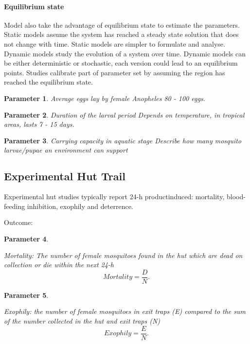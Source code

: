 \documentclass[a4paper, 12pt, twoside]{article}
\newtheorem{parameter}{Parameter}
\begin{document}
\paragraph{Equilibrium state}%
\label{par:equilibrium_state}
Model also take the advantage of equilibrium state to estimate the parameters\cite{Alves2021}.
Static models assume the system has reached a steady state solution that does not change with time.
Static models are simpler to formulate and analyse.
Dynamic models study the evolution of a system over time.
Dynamic models can be either deterministic or stochastic, each version could lead to an equilibrium points.
Studies calibrate part of parameter set by assuming the region has reached the equilibrium state.

\begin{parameter}
  {Average eggs lay by female \textit{Anopheles}}
80 - 100 eggs.
\end{parameter}

\begin{parameter}
  {Duration of the larval period} 
Depends on temperature, in tropical areas, lasts 7 - 15 days.\cite{bayoh_lindsay_2003}
\end{parameter}

\begin{parameter}
  {Carrying capacity in aquatic stage}
Describe how many mosquito larvae/pupae an environment can support
\end{parameter}

\subsection{Experimental Hut Trail}
Experimental hut studies typically report 24-h productinduced: mortality, blood-feeding inhibition, exophily and deterrence.

Outcome:

\begin{parameter}
	\label{eht:mortality}

	Mortality: The number of female mosquitoes found in the hut which are dead on collection or die within the next 24-h
	\[
		Mortality = \frac{D}{N}
		.\]
\end{parameter}


\begin{parameter}
	\label{eht:exophily}

	Exophily: the number of female mosquitoes in exit traps (E) compared to the sum of the number collected in the hut and exit traps (N)
	\[
		Exophily = \frac{E}{N}
		.\]

\end{parameter}
\end{document}
